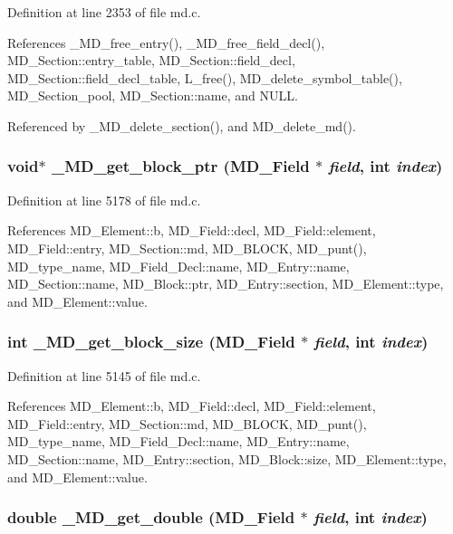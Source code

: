 Definition at line 2353 of file md.c.

References \_\-MD\_\-free\_\-entry(), \_\-MD\_\-free\_\-field\_\-decl(), MD\_\-Section::entry\_\-table, MD\_\-Section::field\_\-decl, MD\_\-Section::field\_\-decl\_\-table, L\_\-free(), MD\_\-delete\_\-symbol\_\-table(), MD\_\-Section\_\-pool, MD\_\-Section::name, and NULL.

Referenced by \_\-MD\_\-delete\_\-section(), and MD\_\-delete\_\-md().
\subsubsection{\setlength{\rightskip}{0pt plus 5cm}void$\ast$ \_\-MD\_\-get\_\-block\_\-ptr (\bf{MD\_\-Field} $\ast$ {\em field}, int {\em index})}\label{md_8h_898294195d5f245139109c36c97ca8fb}




Definition at line 5178 of file md.c.

References MD\_\-Element::b, MD\_\-Field::decl, MD\_\-Field::element, MD\_\-Field::entry, MD\_\-Section::md, MD\_\-BLOCK, MD\_\-punt(), MD\_\-type\_\-name, MD\_\-Field\_\-Decl::name, MD\_\-Entry::name, MD\_\-Section::name, MD\_\-Block::ptr, MD\_\-Entry::section, MD\_\-Element::type, and MD\_\-Element::value.
\subsubsection{\setlength{\rightskip}{0pt plus 5cm}int \_\-MD\_\-get\_\-block\_\-size (\bf{MD\_\-Field} $\ast$ {\em field}, int {\em index})}\label{md_8h_297b39db0c2c0711d95d59a929f8b7e0}




Definition at line 5145 of file md.c.

References MD\_\-Element::b, MD\_\-Field::decl, MD\_\-Field::element, MD\_\-Field::entry, MD\_\-Section::md, MD\_\-BLOCK, MD\_\-punt(), MD\_\-type\_\-name, MD\_\-Field\_\-Decl::name, MD\_\-Entry::name, MD\_\-Section::name, MD\_\-Entry::section, MD\_\-Block::size, MD\_\-Element::type, and MD\_\-Element::value.
\subsubsection{\setlength{\rightskip}{0pt plus 5cm}double \_\-MD\_\-get\_\-double (\bf{MD\_\-Field} $\ast$ {\em field}, int {\em index})}\label{md_8h_8e92a04e4f935b09887e5d2a19edbdfc}




